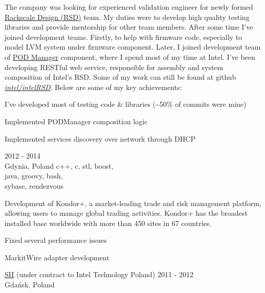 \documentclass[a4paper,11pt]{cv4tw}%
\begin{document}
      {The company was looking for experienced validation engineer for newly formed \href{https://www.intel.com/intelRSD}{Rackscale Design (RSD)} team.
        My duties were to develop high quality testing libraries and provide mentorship for other team members.
        After some time I've joined development teams. Firstly, to help with firmware code, especially to model LVM system under firmware component.
        Later, I joined development team of
        \href{https://www.intel.com/content/www/us/en/architecture-and-technology/rack-scale-design/pod-manager-user-guide-v2-1.html}{POD Manager} component,
        where I spend most of my time at Intel. I've been developing RESTful web service, responsible for assembly and system composition of Intel's RSD. 
        Some of my work can still be found at github \emph{\href{https://github.com/intel/intelRSD}{intel/intelRSD}}. Below are some of my key achievements:
        \begin{missions}
        \item I've developed most of testing code \& libraries (\textasciitilde50\% of commits were mine)
        \item Implemented PODManager composition logic
        \item Implemented services discovery over network through DHCP
        \end{missions}
      }      
      {2012 - 2014\\Gdynia, Poland}
      {c++, c, stl, boost,\\java, groovy, bash,\\sybase, rendezvous}
      {Development of Kondor+, a market-leading trade and risk management platform,
        allowing users to manage global trading activities. Kondor+ has the broadest
        installed base worldwide with more than 450 sites in 67 countries.
        \begin{missions}
        \item Fixed several performance issues
        \item MarkitWire adapter development
        \end{missions}
      }
      {\href{https://sii.pl/en/}{SII} (under contract to Intel Technology Poland)}
      {2011 - 2012\\Gdańsk, Poland}
\end{document}
